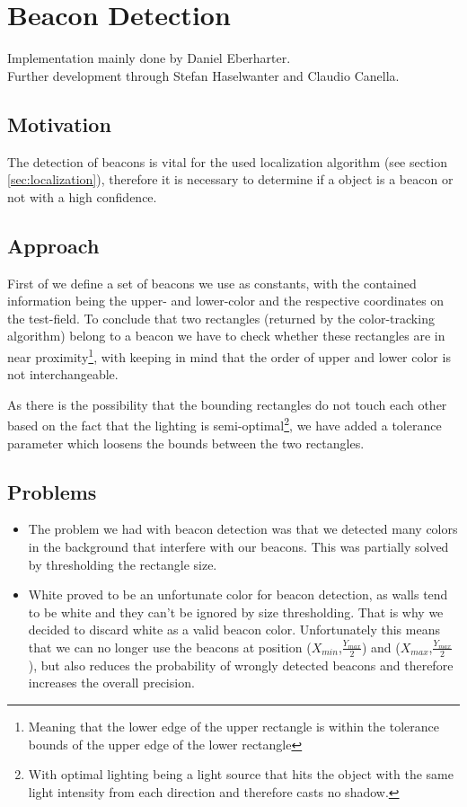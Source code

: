 \documentclass[703031]{iisreport}
\begin{document}
\section{Beacon Detection}
Implementation mainly done by Daniel Eberharter. \\
Further development through Stefan Haselwanter and Claudio Canella.

\subsection{Motivation}
The detection of beacons is vital for the used localization algorithm (see section \ref{sec:localization}), therefore it is necessary to determine if a object is a beacon or not with a high confidence.

\subsection{Approach}
First of we define a set of beacons we use as constants, with the contained information being the upper- and lower-color and the respective coordinates on the test-field. To conclude that two rectangles (returned by the color-tracking algorithm) belong to a beacon we have to check whether these rectangles are in near proximity\footnote{Meaning that the lower edge of the upper rectangle is within the tolerance bounds of the upper edge of the lower rectangle}, with keeping in mind that the order of upper and lower color is not interchangeable.

As there is the possibility that the bounding rectangles do not touch each other based on the fact that the lighting is semi-optimal\footnote{With optimal lighting being a light source that hits the object with the same light intensity from each direction and therefore casts no shadow.}, we have added a tolerance parameter which loosens the bounds between the two rectangles.

\subsection{Problems}
	\begin{itemize}
		\item The problem we had with beacon detection was that we detected many colors in the background that interfere with our beacons. This was partially solved by thresholding the rectangle size.
		\item White proved to be an unfortunate color for beacon detection, as walls tend to be white and they can't be ignored by size thresholding. That is why we decided to discard white as a valid beacon color. Unfortunately this means that we can no longer use the beacons at position ($X_{min}$,$\frac{Y_{max}}{2}$) and ($X_{max}$,$\frac{Y_{max}}{2}$), but also reduces the probability of wrongly detected beacons and therefore increases the overall precision.
	\end{itemize}
\end{document}
